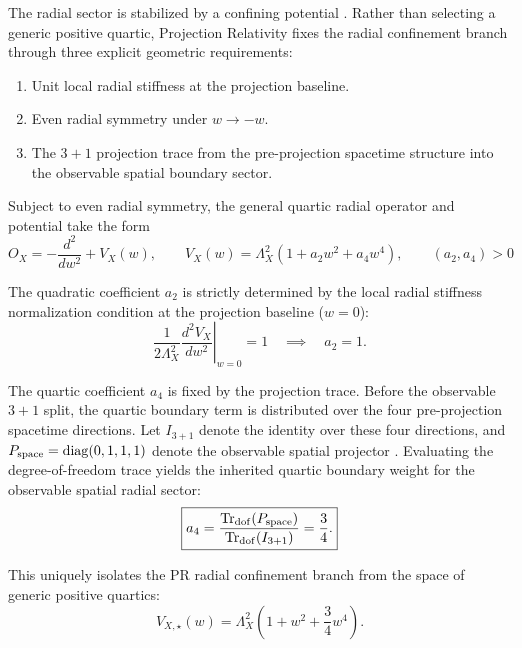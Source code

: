 \documentclass[11pt]{article}
\begin{document}
The radial sector is stabilized by a confining potential \cite{Simon1970}. Rather than selecting a generic positive quartic, Projection Relativity fixes the radial confinement branch through three explicit geometric requirements:

\begin{tcolorbox}[colback=black!2!white, colframe=black!75!white, title=\textbf{Projection Baseline Constraints}]
\begin{enumerate}
    \item Unit local radial stiffness at the projection baseline.
    \item Even radial symmetry under \(w \rightarrow -w\).
    \item The \(3+1\) projection trace from the pre-projection spacetime structure into the observable spatial boundary sector.
\end{enumerate}
\end{tcolorbox}

Subject to even radial symmetry, the general quartic radial operator and potential take the form
\begin{equation}
    \boxed{ O_X = -\frac{d^2}{dw^2} + V_X(w),  \qquad 
    V_X(w) = \Lambda_X^2 \left( 1 + a_2w^2 + a_4w^4 \right), \qquad
    (a_2, a_4) > 0}
\end{equation}

The quadratic coefficient \(a_2\) is strictly determined by the local radial stiffness normalization condition at the projection baseline (\(w=0\)):
\begin{equation}
    \boxed{ \left. \frac{1}{2\Lambda_X^2} \frac{d^2V_X}{dw^2} \right|_{w=0} = 1 \quad \implies \quad a_2 = 1. }
\end{equation}

The quartic coefficient \(a_4\) is fixed by the projection trace. Before the observable \(3+1\) split, the quartic boundary term is distributed over the four pre-projection spacetime directions. Let \(I_{3+1}\) denote the identity over these four directions, and \(P_{\rm space} = \operatorname{diag}(0,1,1,1)\) denote the observable spatial projector \cite{ADM1962}. Evaluating the degree-of-freedom trace yields the inherited quartic boundary weight for the observable spatial radial sector:
\begin{equation}
    \boxed{ a_4 = \frac{\operatorname{Tr}_{\rm dof}(P_{\rm space})}{\operatorname{Tr}_{\rm dof}(I_{3+1})} = \frac{3}{4}. }
\end{equation}

This uniquely isolates the PR radial confinement branch from the space of generic positive quartics:
\begin{equation}
    \boxed{ V_{X,\star}(w) = \Lambda_X^2 \left( 1 + w^2 + \frac{3}{4}w^4 \right). }
\end{equation}
\end{document}
